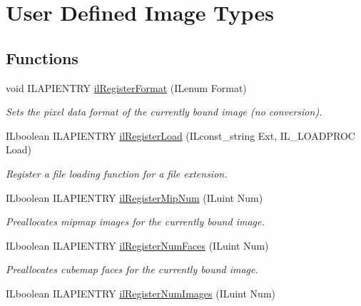 \hypertarget{group__register}{\section{User Defined Image Types}
\label{group__register}
}
\subsection*{Functions}
\begin{DoxyCompactItemize}
\item 
void I\-L\-A\-P\-I\-E\-N\-T\-R\-Y \hyperlink{group__register_gab16decaa97a48109c9decee6eaa65d2b}{il\-Register\-Format} (I\-Lenum Format)
\begin{DoxyCompactList}\small\item\em Sets the pixel data format of the currently bound image (no conversion). \end{DoxyCompactList}\item 
\hypertarget{group__register_ga187276b36d61a040c08efdb6350b4824}{I\-Lboolean I\-L\-A\-P\-I\-E\-N\-T\-R\-Y \hyperlink{group__register_ga187276b36d61a040c08efdb6350b4824}{il\-Register\-Load} (I\-Lconst\-\_\-string Ext, I\-L\-\_\-\-L\-O\-A\-D\-P\-R\-O\-C Load)}\label{group__register_ga187276b36d61a040c08efdb6350b4824}

\begin{DoxyCompactList}\small\item\em Register a file loading function for a file extension. \end{DoxyCompactList}\item 
\hypertarget{group__register_ga7908a7a8f4b3544b76411300e1059bc9}{I\-Lboolean I\-L\-A\-P\-I\-E\-N\-T\-R\-Y \hyperlink{group__register_ga7908a7a8f4b3544b76411300e1059bc9}{il\-Register\-Mip\-Num} (I\-Luint Num)}\label{group__register_ga7908a7a8f4b3544b76411300e1059bc9}

\begin{DoxyCompactList}\small\item\em Preallocates mipmap images for the currently bound image. \end{DoxyCompactList}\item 
\hypertarget{group__register_ga309eed368a7585dfaa12ed096d2fcef5}{I\-Lboolean I\-L\-A\-P\-I\-E\-N\-T\-R\-Y \hyperlink{group__register_ga309eed368a7585dfaa12ed096d2fcef5}{il\-Register\-Num\-Faces} (I\-Luint Num)}\label{group__register_ga309eed368a7585dfaa12ed096d2fcef5}

\begin{DoxyCompactList}\small\item\em Preallocates cubemap faces for the currently bound image. \end{DoxyCompactList}\item 
\hypertarget{group__register_ga0b3448c79f53f70b5716bab4b82a45cb}{I\-Lboolean I\-L\-A\-P\-I\-E\-N\-T\-R\-Y \hyperlink{group__register_ga0b3448c79f53f70b5716bab4b82a45cb}{il\-Register\-Num\-Images} (I\-Luint Num)}\label{group__register_ga0b3448c79f53f70b5716bab4b82a45cb}


\end{DoxyCompactItemize}
